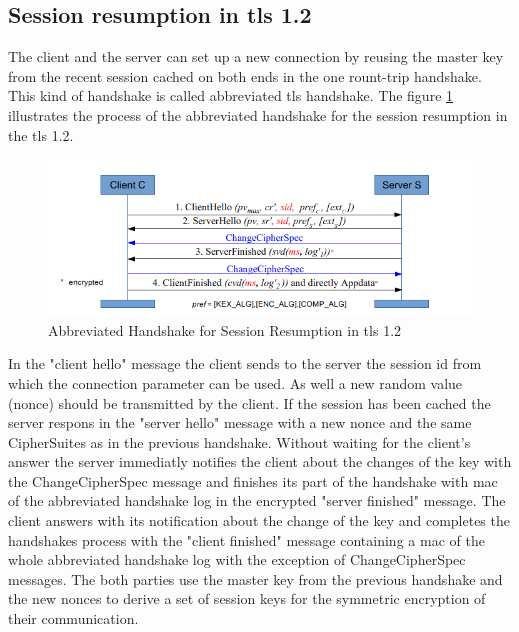 \subsection{Session resumption in \gls{tls} 1.2}
\label{subsec:resumption1_2}

The client and the server can set up a new connection by reusing the master key from the recent session cached on both ends in the one rount-trip handshake. This kind of handshake is called abbreviated \gls{tls} handshake. The figure \ref{fig:resumption1_2} illustrates the process of the abbreviated handshake for the session resumption in the \gls{tls} 1.2.

\begin{figure}[H]
	\centering
		\includegraphics[scale=0.85]{images/resumption1_2.png}
	\caption{Abbreviated Handshake for Session Resumption in \gls{tls} 1.2 \cite{Hassenstein}}
	\label{fig:resumption1_2}
\end{figure}

In the "client hello" message the client sends to the server the session id from which the connection parameter can be used. As well a new random value (nonce) should be transmitted by the client. If the session has been cached the server respons in the "server hello" message with a new nonce and the same CipherSuites as in the previous handshake. Without waiting for the client's answer the server immediatly notifies the client about the changes of the key with the ChangeCipherSpec message and finishes its part of the handshake with \gls{mac} of the abbreviated handshake log in the encrypted "server finished" message. The client answers with its notification about the change of the key and completes the handshakes process with the "client finished" message containing a \gls{mac} of the whole abbreviated handshake log with the exception of ChangeCipherSpec messages. The both parties use the master key from the previous handshake and the new nonces to derive a set of session keys for the symmetric encryption of their communication.

